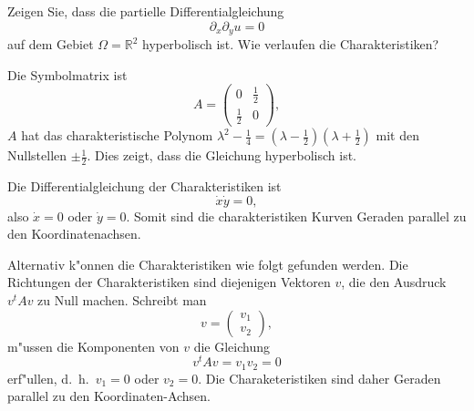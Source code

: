 Zeigen Sie, dass die partielle Differentialgleichung
\[
\partial_x\partial_y u=0
\]
auf dem Gebiet $\Omega=\mathbb R^2$ hyperbolisch ist.
Wie verlaufen die Charakteristiken?

\begin{loesung}
Die Symbolmatrix ist
\[
A=\begin{pmatrix}0&\frac12\\\frac12&0\end{pmatrix},
\]
$A$ hat das charakteristische Polynom
$\lambda^2-\frac14=(\lambda-\frac12)(\lambda+\frac12)$ mit den Nullstellen
$\pm\frac12$.
Dies zeigt, dass die Gleichung hyperbolisch ist.

Die Differentialgleichung der Charakteristiken ist
\[
\dot x\dot y=0,
\]
also $\dot x=0$ oder $\dot y=0$. Somit sind die charakteristiken Kurven
Geraden parallel zu den Koordinatenachsen.

Alternativ k"onnen die Charakteristiken wie folgt gefunden werden.
Die Richtungen der Charakteristiken sind diejenigen Vektoren $v$, die
den Ausdruck $v^tAv$ zu Null machen. Schreibt man
\[
v=\begin{pmatrix}v_1\\v_2\end{pmatrix},
\]
m"ussen die Komponenten von $v$ die Gleichung
\[
v^tAv=v_1v_2=0
\]
erf"ullen, d.~h.~$v_1=0$ oder $v_2=0$. Die Charaketeristiken sind daher
Geraden parallel zu den Koordinaten-Achsen.
\end{loesung}
